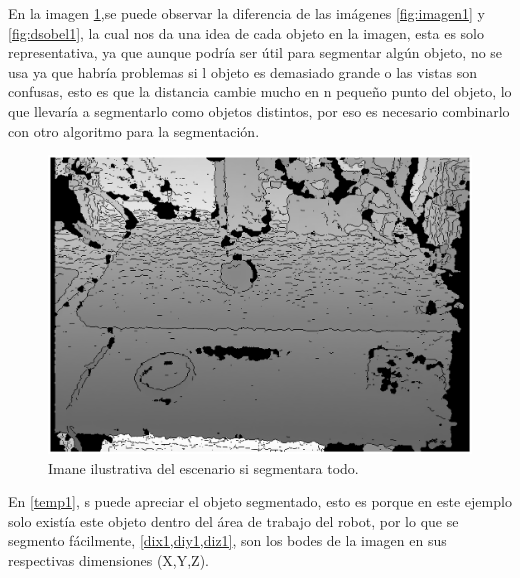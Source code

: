 En la imagen \cref{fig:dbordes1},se puede observar la diferencia de las imágenes \cref{fig:imagen1} y \cref{fig:dsobel1}, la cual nos da una idea de cada objeto en la imagen, esta es solo representativa, ya que aunque podría ser útil para segmentar algún objeto, no se usa ya que habría problemas si l objeto es demasiado grande o las vistas son confusas, esto es que la distancia cambie mucho en n pequeño punto del objeto, lo que llevaría a segmentarlo como objetos distintos, por eso es necesario combinarlo con otro algoritmo para la segmentación.
\begin{figure}
	\centering
	\includegraphics[width=.9\linewidth]{visio/graficasderesultados/Dbordes1}
	\caption{Imane ilustrativa del escenario si segmentara todo.}
	\label{fig:dbordes1}
\end{figure}



En \cref{temp1}, s puede apreciar el objeto segmentado, esto es porque en este ejemplo solo existía este objeto dentro del área de trabajo del  robot, por lo que se segmento fácilmente, \cref{dix1,diy1,diz1}, son los bodes de la imagen en sus respectivas dimensiones (X,Y,Z).

